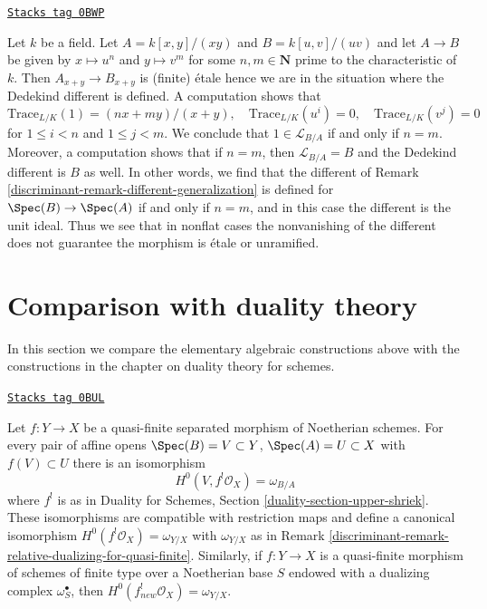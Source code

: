 \begin{example}[No different]
\label{discriminant-example-no-different}
\href{https://stacks.math.columbia.edu/tag/0BWP}{\texttt{Stacks tag 0BWP}}

Let $k$ be a field. Let $A = k[x, y]/(xy)$ and $B = k[u, v]/(uv)$ and let
$A \to B$ be given by $x \mapsto u^n$ and $y \mapsto v^m$ for some
$n, m \in \mathbf{N}$ prime to the characteristic of $k$. Then
$A_{x + y} \to B_{x + y}$ is (finite) \'etale hence we are in the situation
where the Dedekind different is defined. A computation shows that
$$
\text{Trace}_{L/K}(1) = (nx + my)/(x + y),\quad
\text{Trace}_{L/K}(u^i) = 0,\quad \text{Trace}_{L/K}(v^j) = 0
$$
for $1 \leq i < n$ and $1 \leq j < m$. We conclude that
$1 \in \mathcal{L}_{B/A}$ if and only if $n = m$. Moreover, a
computation shows that if $n = m$, then $\mathcal{L}_{B/A} = B$
and the Dedekind different is $B$ as well. In other words, we find that
the different of Remark \ref{discriminant-remark-different-generalization}
is defined for $\Spec(B) \to \Spec(A)$
if and only if $n = m$, and in this case the different is the
unit ideal. Thus we see that in nonflat cases the nonvanishing
of the different does not guarantee the morphism is \'etale or unramified.
\end{example}

\section{Comparison with duality theory}
\label{discriminant-section-comparison}
In this section we compare the elementary algebraic constructions
above with the constructions in the chapter on duality theory
for schemes.

\begin{lemma}
\label{discriminant-lemma-compare-dualizing}
\href{https://stacks.math.columbia.edu/tag/0BUL}{\texttt{Stacks tag 0BUL}}

Let $f : Y \to X$ be a quasi-finite separated morphism of Noetherian schemes.
For every pair of affine opens $\Spec(B) = V \subset Y$,
$\Spec(A) = U \subset X$ with $f(V) \subset U$ there is an isomorphism
$$
H^0(V, f^!\mathcal{O}_X) = \omega_{B/A}
$$
where $f^!$ is as in
Duality for Schemes, Section \ref{duality-section-upper-shriek}.
These isomorphisms are compatible with restriction maps and define a canonical
isomorphism $H^0(f^!\mathcal{O}_X) = \omega_{Y/X}$ with
$\omega_{Y/X}$ as in Remark \ref{discriminant-remark-relative-dualizing-for-quasi-finite}.
Similarly, if $f : Y \to X$ is a quasi-finite morphism of schemes of
finite type over a Noetherian base $S$ endowed with a dualizing complex
$\omega_S^\bullet$, then $H^0(f_{new}^!\mathcal{O}_X) = \omega_{Y/X}$.
\end{lemma}

